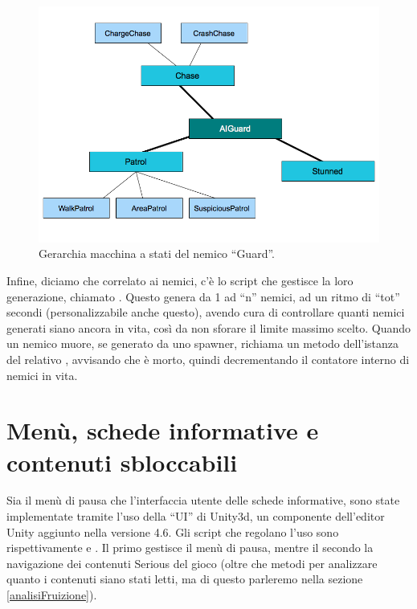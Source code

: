 \begin{figure}[h]
\centerline{\includegraphics[scale=0.45]{images/development/gerarchiaAIGuard.png}}
\caption{Gerarchia macchina a stati del nemico ``Guard''.}
\label{fig:gerarchiaAIGuard}
\end{figure}

Infine, diciamo che correlato ai nemici, c'è lo script che gestisce la loro generazione, chiamato . Questo genera da 1 ad ``n'' nemici, ad un ritmo di ``tot'' secondi (personalizzabile anche questo), avendo cura di controllare quanti nemici generati siano ancora in vita, così da non sforare il limite massimo scelto. Quando un nemico muore, se generato da uno spawner, richiama un metodo dell'istanza del relativo , avvisando che è morto, quindi decrementando il contatore interno di nemici in vita.

\section{Menù, schede informative e contenuti sbloccabili}

Sia il menù di pausa che l'interfaccia utente delle schede informative, sono state implementate tramite l'uso della ``UI'' di Unity3d, un componente dell'editor Unity aggiunto nella versione 4.6. Gli script che regolano l'uso sono rispettivamente  e . Il primo gestisce il menù di pausa, mentre il secondo la navigazione dei contenuti Serious del gioco (oltre che metodi per analizzare quanto i contenuti siano stati letti, ma di questo parleremo nella sezione \ref{analisiFruizione}). 

